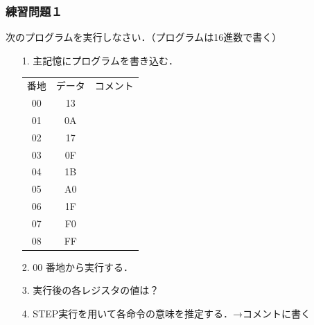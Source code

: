 \documentclass[handout]{beamer}         %
\begin{document}
\begin{frame}
  \frametitle{練習問題１}
  次のプログラムを実行しなさい．（プログラムは16進数で書く）
  \begin{enumerate}
    \item[1.] 主記憶にプログラムを書き込む．\\
      \begin{tabular}{c c l}
        番地 & データ & コメント \\
        00   & 13     &          \\
        01   & 0A     &          \\
        02   & 17     &          \\
        03   & 0F     &          \\
        04   & 1B     &          \\
        05   & A0     &          \\
        06   & 1F     &          \\
        07   & F0     &          \\
        08   & FF     &          \\
      \end{tabular}
    \item[2.] 00 番地から実行する．
    \item[3.] 実行後の各レジスタの値は？
    \item[4.] STEP実行を用いて各命令の意味を推定する．→コメントに書く
  \end{enumerate}
\end{frame}
\end{document}
